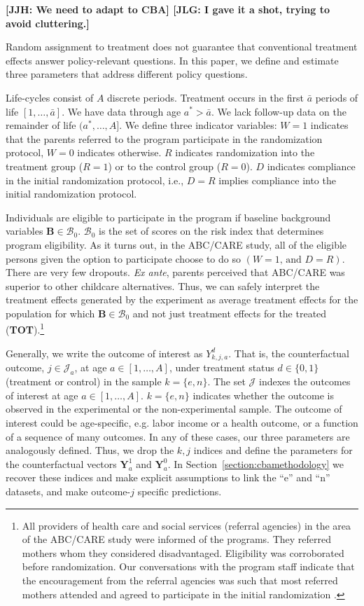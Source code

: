 \textbf{[JJH: We need to adapt to CBA] [JLG: I gave it a shot, trying to avoid cluttering.]}

Random assignment to treatment does not guarantee that conventional treatment effects answer policy-relevant questions. In this paper, we define and estimate three parameters that address different policy questions. 

Life-cycles consist of $A$ discrete periods. Treatment occurs in the first $\bar{a}$ periods of life $\left[1,\dots,\bar{a}\right]$. We have data through age $a^{*}>\bar{a}$. We lack follow-up data on the remainder of life $(a^*,\dots,A]$. We define three indicator variables: $W = 1$ indicates that the parents referred to the program participate in the randomization protocol, $W = 0$ indicates otherwise. $R$ indicates randomization into the treatment group ($R = 1$) or to the control group ($R = 0$). $D$ indicates compliance in the initial randomization protocol, i.e., $D = R$ implies compliance into the initial randomization protocol.

Individuals are eligible to participate in the program if baseline background variables $\bm{B}\in\mathcal{B}_0$. $\mathcal{B}_0$ is the set of scores on the risk index that determines program eligibility. As it turns out, in the ABC/CARE study, all of the eligible persons given the option to participate choose to do so $(W=1\text{, and } D=R)$. There are very few dropouts. \emph{Ex ante}, parents perceived that ABC/CARE was superior to other childcare alternatives. Thus, we can safely interpret the treatment effects generated by the experiment as average treatment effects for the population for which $\bm{B}\in\mathcal{B}_0$ and not just treatment effects for the treated (\textbf{TOT}).\footnote{All providers of health care and social services (referral agencies) in the area of the ABC/CARE study were informed of the programs. They referred mothers whom they considered disadvantaged. Eligibility was corroborated before randomization. Our conversations with the program staff indicate that the encouragement from the referral agencies was such that most referred mothers attended and agreed to participate in the initial randomization \citep{Ramey-etal_2012-ABC}.}

Generally, we write the outcome of interest as $Y_{k,j,a}^d$. That is, the counterfactual outcome, $j \in \mathcal{J}_a$, at age $a \in [1, \ldots, A]$, under treatment status $d \in \{0, 1\}$ (treatment or control) in the sample $k = \{e, n \}$. The set $\mathcal{J}$ indexes the outcomes of interest at age $a \in [1, \ldots, A]$. $k = \{e, n\}$ indicates whether the outcome is observed in the experimental or the non-experimental sample. The outcome of interest could be age-specific, e.g. labor income or a health outcome, or a function of a sequence of many outcomes. In any of these cases, our three parameters are analogously defined. Thus, we drop the $k,j$ indices and define the parameters for the counterfactual vectors $\bm{Y}^1_a$ and $\bm{Y}^0_a$. In Section~\ref{section:cbamethodology} we recover these indices and make explicit assumptions to link the ``e'' and ``n'' datasets, and make outcome-$j$ specific predictions.

